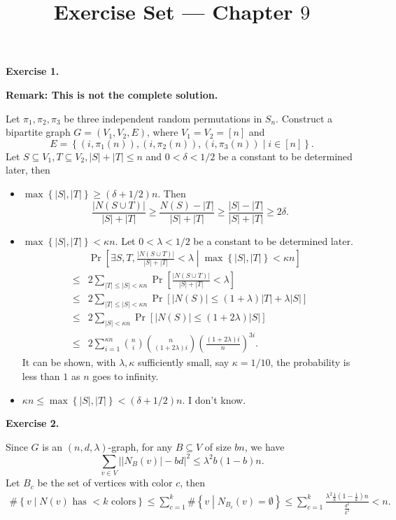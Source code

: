 \documentclass[a4paper]{article}
\title{Exercise Set --- Chapter $9$}
\date{}
\newenvironment{exercise}[1]{
	\par
	\noindent\textbf{Exercise #1.}\quad
}{
	\par
	\bigskip
}
\newcommand{\abs}[1]{\left| #1 \right|}
\newcommand{\pbra}[1]{\left( #1 \right)}
\newcommand{\cbra}[1]{\left\{ #1 \right\}}
\newcommand{\sbra}[1]{\left[ #1 \right]}
\begin{document}
\maketitle

\begin{exercise}{1}
    \textbf{Remark: This is not the complete solution.}

    Let $\pi_1,\pi_2,\pi_3$ be three independent random permutations in $S_n$.
    Construct a bipartite graph $G=(V_1,V_2,E)$, where $V_1=V_2=[n]$ and 
    $$
    E=\cbra{(i,\pi_1(n)),(i,\pi_2(n)),(i,\pi_3(n))\middle|i\in[n]}.
    $$
    Let $S\subseteq V_1,T\subseteq V_2,|S|+|T|\leq n$ and $0<\delta<1/2$ be a constant to be determined later, then 
    \begin{itemize}
        \item $\max\cbra{|S|,|T|}\geq(\delta+1/2)n$. Then 
            $$
            \frac{|N(S\cup T)|}{|S|+|T|}\geq\frac{N(S)-|T|}{|S|+|T|}\geq\frac{|S|-|T|}{|S|+|T|}\geq2\delta.
            $$
        \item $\max\cbra{|S|,|T|}<\kappa n$. Let $0<\lambda<1/2$ be a constant to be determined later.
            \begin{align*}
                &\Pr\sbra{\exists S,T,\frac{|N(S\cup T)|}{|S|+|T|}<\lambda\middle|\max\cbra{|S|,|T|}<\kappa n}\\
                \leq&2\sum_{|T|\leq|S|<\kappa n}\Pr\sbra{\frac{|N(S\cup T)|}{|S|+|T|}<\lambda}\\
                \leq&2\sum_{|T|\leq|S|<\kappa n}\Pr\sbra{|N(S)|\leq(1+\lambda)|T|+\lambda|S|}\\
                \leq&2\sum_{|S|<\kappa n}\Pr\sbra{|N(S)|\leq(1+2\lambda)|S|}\\
                \leq&2\sum_{i=1}^{\kappa n}\binom ni\binom n{(1+2\lambda)i}\pbra{\frac{(1+2\lambda)i}n}^{3i}.
            \end{align*}
            It can be shown, with $\lambda,\kappa$ sufficiently small, say $\kappa=1/10$, the probability is less than $1$ as $n$ goes to infinity.
        \item $\kappa n\leq\max\cbra{|S|,|T|}<(\delta+1/2)n$. I don't know.
    \end{itemize}
\end{exercise}

\begin{exercise}{2}
    Since $G$ is an $(n,d,\lambda)$-graph, for any $B\subseteq V$ of size $bn$, we have
    $$
    \sum_{v\in V}\abs{|N_B(v)|-bd}^2\leq\lambda^2b(1-b)n.
    $$
    Let $B_c$ be the set of vertices with color $c$,
    then
    \begin{align*}
        \#\cbra{v\middle|N(v)\text{ has $<k$ colors}}
        \leq\sum_{c=1}^k\#\cbra{v\middle|N_{B_c}(v)=\emptyset}
        \leq\sum_{c=1}^k\frac{\lambda^2\frac1k\pbra{1-\frac1k}n}{\frac{d^2}{k^2}}<n.
    \end{align*}
\end{exercise}
\end{document}
